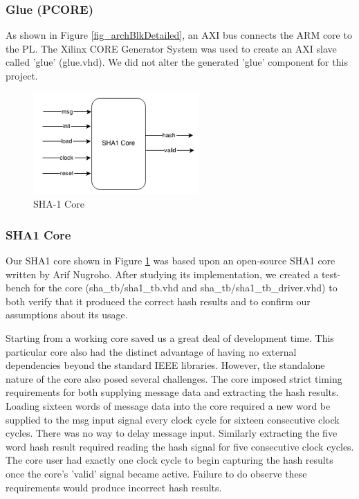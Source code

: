 \documentclass[journal]{IEEEtran}
\begin{document}
\subsubsection{Glue (PCORE)}
As shown in Figure \ref{fig_archBlkDetailed}, an AXI bus connects the ARM core to the PL. The Xilinx CORE Generator System \cite{COREGEN} was used to create an AXI slave called 'glue' (glue.vhd).  We did not alter the generated 'glue' component for this project.
\begin{figure}[ht]
\centering
\includegraphics[width=2.5in]{Sha1_Core_Block_Diagram.png}
\caption{SHA-1 Core}
\label{fig_algoCore}
\end{figure} 
\subsubsection{SHA1 Core}
Our SHA1 core shown in Figure \ref{fig_algoCore} was based upon an open-source SHA1 core written by Arif Nugroho\cite{SHAOPEN}. After studying its implementation, we created a test-bench for the core (sha\_tb/sha1\_tb.vhd and sha\_tb/sha1\_tb\_driver.vhd) to both verify that it produced the correct hash results and to confirm our assumptions about its usage.

Starting from a working core saved us a great deal of development time. This particular core also had the distinct advantage of having no external dependencies beyond the standard IEEE libraries. However, the standalone nature of the core also posed several challenges. The core imposed strict timing requirements for both supplying message data and extracting the hash results. Loading sixteen words of message data into the core required a new word be supplied to the msg input signal every clock cycle for sixteen consecutive clock cycles. There was no way to delay message input. Similarly extracting the five word hash result required reading the hash signal for five consecutive clock cycles. The core user had exactly one clock cycle to begin capturing the hash results once the core's 'valid' signal became active.  Failure to do observe these requirements would produce incorrect hash results.
\end{document}
